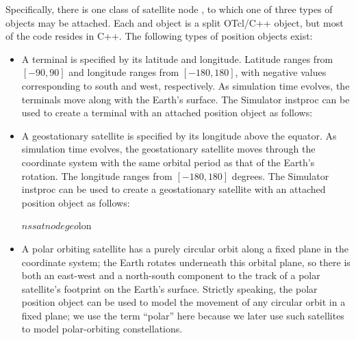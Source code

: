 Specifically, there is one class of satellite node ,
to which one of three types of  objects may be attached.  
Each  and  object is a split OTcl/C++ object,
but most of the code resides in C++.  The following types of position objects 
exist: 
\begin{itemize}
\item {} A terminal is specified by its latitude and
longitude.  Latitude ranges from $[-90, 90]$ and longitude ranges from
$[-180, 180]$, with negative values corresponding to south and west, 
respectively.  As simulation time evolves, the terminals move along
with the Earth's surface.  The  Simulator instproc  can be used 
to create a terminal with an attached position object as follows:
\item {} A geostationary satellite is specified by its 
longitude above the equator.  As simulation time evolves, the geostationary
satellite moves through the coordinate system with the same orbital period
as that of the Earth's rotation.  The longitude ranges from $[-180,180]$
degrees.  The Simulator instproc  can be 
used to create a geostationary satellite with an attached position object as 
follows:
\begin{program}
$ns satnode geo $lon
\end{program}
\item {} A polar orbiting satellite has a purely
circular orbit along a fixed plane in the coordinate system; the Earth
rotates underneath this orbital plane, so there is both an east-west and
a north-south component to the track of a polar satellite's footprint on
the Earth's surface.  Strictly speaking, the polar position object can
be used to model the movement of any circular orbit in a fixed plane;  
we use the term ``polar'' here because we later use such satellites to model 
polar-orbiting constellations.


\end{itemize}
